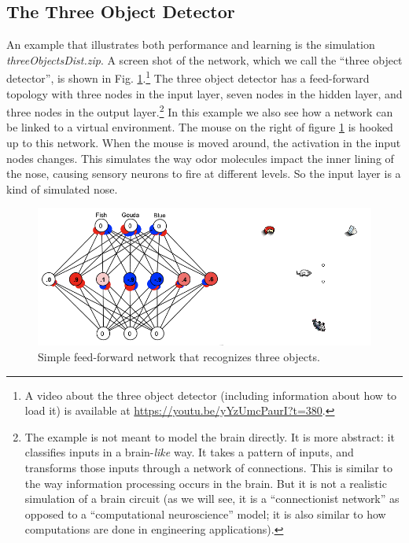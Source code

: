 \subsection{The Three Object Detector}

An example that illustrates both performance and learning is the simulation  {\em threeObjectsDist.zip}.  A screen shot of the network, which we call the ``three object detector'',  is shown in Fig. \ref{3ObjectClassifier}.\footnote{A video about the three object detector (including information about how to load it) is available at \url{https://youtu.be/yYzUmcPaurI?t=380}. } The three object detector has a feed-forward topology with three nodes in the input layer, seven nodes in the hidden layer, and three nodes in the output layer.\footnote{The example is not meant to model the brain directly. It is more abstract:  it classifies inputs in a  brain-\emph{like} way. It takes a pattern of inputs, and transforms those inputs through a network of connections. This is similar to the way information processing occurs in the brain. But it is not a realistic simulation of a brain circuit (as we will see, it is a ``connectionist network'' as opposed to a ``computational neuroscience'' model; it is also similar to how computations are done in engineering applications).} In this example we also see how a network can be linked to a virtual environment. The mouse on the right of figure \ref{3ObjectClassifier} is hooked up to this network. When the mouse is moved around, the activation in the input nodes changes. This simulates the way odor molecules impact the inner lining of the nose, causing sensory neurons to fire at different levels. So the input layer is a kind of simulated nose. 
\begin{figure}[h]
\centering
\includegraphics[scale=.4]{./images/3Node_World.png}
\caption[Simbrain screenshot.]{Simple feed-forward network that recognizes three objects.}
\label{3ObjectClassifier}
\end{figure}


